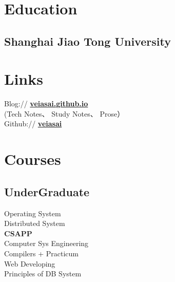 \documentclass[]{deedy-resume-openfont}
\begin{document}
%
%
\lastupdated

%
%

%
%

\begin{minipage}[t]{0.25\textwidth} 


\section{Education} 
\sectionsep

\subsection{Shanghai Jiao Tong University}
\sectionsep


\section{Links}
\sectionsep
Blog://  \href{http://veiasai.github.io}{\bf veiasai.github.io} \\
(Tech Notes、 Study Notes、 Prose） \\
Github:// \href{https://github.com/veiasai}{\bf veiasai} \\
\sectionsep


\section{Courses}
\sectionsep
\subsection{UnderGraduate}
Operating System \\
Distributed System \\
\textbf{CSAPP} \\
Computer Sys Engineering \\
Compilers + Practicum \\
Web Developing \\
Principles of DB System  \\
\sectionsep


\end{minipage}
\end{document}
